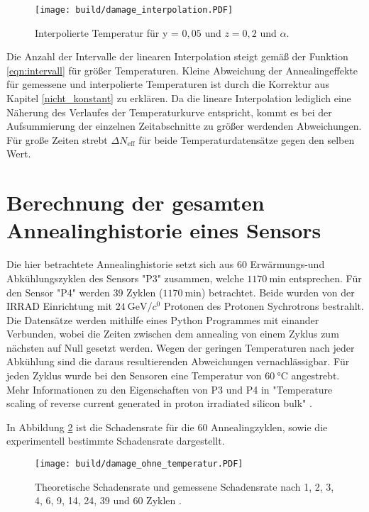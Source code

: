 \begin{figure}
    \texttt{[image: build/damage\_interpolation.PDF]}
\caption{Interpolierte Temperatur für y = $0,05$ und $z=0,2$ und $\alpha$.}
\label{fig:interpolation_damage}
\end{figure}

Die Anzahl der Intervalle der linearen Interpolation steigt gemäß der Funktion \ref{eqn:intervall}
für größer Temperaturen. Kleine Abweichung der Annealingeffekte für gemessene und
interpolierte Temperaturen ist durch die Korrektur aus Kapitel \ref{nicht_konstant}
zu erklären. Da die lineare Interpolation lediglich eine Näherung des Verlaufes der
Temperaturkurve entspricht, kommt es bei der Aufsummierung der einzelnen Zeitabschnitte
zu größer werdenden Abweichungen. Für große Zeiten strebt $\Delta N_{\mathrm{eff}}$
für beide Temperaturdatensätze gegen den selben Wert.

\section{Berechnung der gesamten Annealinghistorie eines Sensors}
Die hier betrachtete Annealinghistorie setzt sich aus 60 Erwärmungs-und
Abkühlungszyklen des Sensors "P3" zusammen, welche $\SI{1170}{\minute}$ entsprechen.
Für den Sensor "P4" werden 39 Zyklen ($\SI{1170}{\minute}$) betrachtet.
Beide wurden von der IRRAD Einrichtung mit $\SI{24}{\giga\eV\per\clight}$ Protonen des Protonen Sychrotrons bestrahlt.
Die Datensätze werden mithilfe eines Python Programmes mit einander Verbunden,
wobei die Zeiten zwischen dem annealing von einem Zyklus zum nächsten auf Null gesetzt werden. Wegen der geringen
Temperaturen nach jeder Abkühlung sind die daraus resultierenden Abweichungen vernachlässigbar.
Für jeden Zyklus wurde bei den Sensoren eine Temperatur von $\SI{60}{\celsius}$ angestrebt.
Mehr Informationen zu den Eigenschaften von P3 und P4 in "Temperature scaling of reverse current generated in
proton irradiated silicon bulk" \cite{felix}.


In Abbildung \ref{fig:P_3} ist die Schadensrate für die 60 Annealingzyklen,
sowie die experimentell bestimmte Schadensrate dargestellt.

\begin{figure}
    \texttt{[image: build/damage\_ohne\_temperatur.PDF]}
\caption{Theoretische Schadensrate und gemessene Schadensrate nach 1, 2, 3, 4, 6, 9, 14, 24, 39 und 60 Zyklen .}
\label{fig:P_3}
\end{figure}

